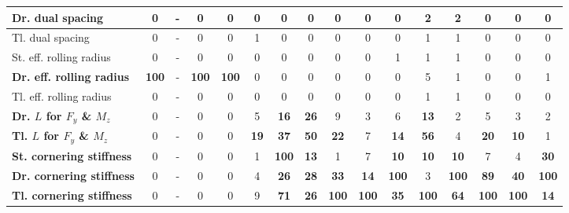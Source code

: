 \begin{table}[H]
\begin{tabular}{|l|c|c|c|c|c|c|c|c|c|c|c|c|c|c|c|}
\hline
Dr. dual spacing & 0 & - & 0 & 0 & 0 & 0 & 0 & 0 & 0 & 0 & 2 & 2 & 0 & 0 & 0 \\
\hline
Tl. dual spacing & 0 & - & 0 & 0 & 1 & 0 & 0 & 0 & 0 & 0 & 1 & 1 & 0 & 0 & 0 \\
\hline
St. eff. rolling radius & 0 & - & 0 & 0 & 0 & 0 & 0 & 0 & 0 & 1 & 1 & 1 & 0 & 0 & 0 \\
\hline
\textcolor[rgb]{0.851, 0.373, 0.008}{\textbf{Dr. eff. rolling radius}} & \textcolor[rgb]{0.835, 0.369, 0.000}{\textbf{100}} & - & \textcolor[rgb]{0.835, 0.369, 0.000}{\textbf{100}} & \textcolor[rgb]{0.835, 0.369, 0.000}{\textbf{100}} & 0 & 0 & 0 & 0 & 0 & 0 & 5 & 1 & 0 & 0 & 1 \\
\hline
Tl. eff. rolling radius & 0 & - & 0 & 0 & 0 & 0 & 0 & 0 & 0 & 0 & 1 & 1 & 0 & 0 & 0 \\
\hline
\textcolor[rgb]{0.000, 0.620, 0.451}{\textbf{Dr. $L$ for $F_y$ \& $M_z$}} & 0 & - & 0 & 0 & 5 & \textbf{16} & \textcolor[rgb]{0.000, 0.620, 0.451}{\textbf{26}} & 9 & 3 & 6 & \textbf{13} & 2 & 5 & 3 & 2 \\
\hline
\textcolor[rgb]{0.000, 0.447, 0.698}{\textbf{Tl. $L$ for $F_y$ \& $M_z$}} & 0 & - & 0 & 0 & \textbf{19} & \textcolor[rgb]{0.000, 0.620, 0.451}{\textbf{37}} & \textcolor[rgb]{0.000, 0.447, 0.698}{\textbf{50}} & \textbf{22} & 7 & \textbf{14} & \textcolor[rgb]{0.000, 0.447, 0.698}{\textbf{56}} & 4 & \textbf{20} & \textbf{10} & 1 \\
\hline
\textcolor[rgb]{0.851, 0.373, 0.008}{\textbf{St. cornering stiffness}} & 0 & - & 0 & 0 & 1 & \textcolor[rgb]{0.835, 0.369, 0.000}{\textbf{100}} & \textbf{13} & 1 & 7 & \textbf{10} & \textbf{10} & \textbf{10} & 7 & 4 & \textcolor[rgb]{0.000, 0.620, 0.451}{\textbf{30}} \\
\hline
\textcolor[rgb]{0.851, 0.373, 0.008}{\textbf{Dr. cornering stiffness}} & 0 & - & 0 & 0 & 4 & \textcolor[rgb]{0.000, 0.620, 0.451}{\textbf{26}} & \textcolor[rgb]{0.000, 0.620, 0.451}{\textbf{28}} & \textcolor[rgb]{0.000, 0.620, 0.451}{\textbf{33}} & \textbf{14} & \textcolor[rgb]{0.835, 0.369, 0.000}{\textbf{100}} & 3 & \textcolor[rgb]{0.835, 0.369, 0.000}{\textbf{100}} & \textcolor[rgb]{0.000, 0.447, 0.698}{\textbf{89}} & \textcolor[rgb]{0.000, 0.620, 0.451}{\textbf{40}} & \textcolor[rgb]{0.835, 0.369, 0.000}{\textbf{100}} \\
\hline
\textcolor[rgb]{0.851, 0.373, 0.008}{\textbf{Tl. cornering stiffness}} & 0 & - & 0 & 0 & 9 & \textcolor[rgb]{0.000, 0.447, 0.698}{\textbf{71}} & \textcolor[rgb]{0.000, 0.620, 0.451}{\textbf{26}} & \textcolor[rgb]{0.835, 0.369, 0.000}{\textbf{100}} & \textcolor[rgb]{0.835, 0.369, 0.000}{\textbf{100}} & \textcolor[rgb]{0.000, 0.620, 0.451}{\textbf{35}} & \textcolor[rgb]{0.835, 0.369, 0.000}{\textbf{100}} & \textcolor[rgb]{0.000, 0.447, 0.698}{\textbf{64}} & \textcolor[rgb]{0.835, 0.369, 0.000}{\textbf{100}} & \textcolor[rgb]{0.835, 0.369, 0.000}{\textbf{100}} & \textbf{14} \\

\end{tabular}
\end{table}
